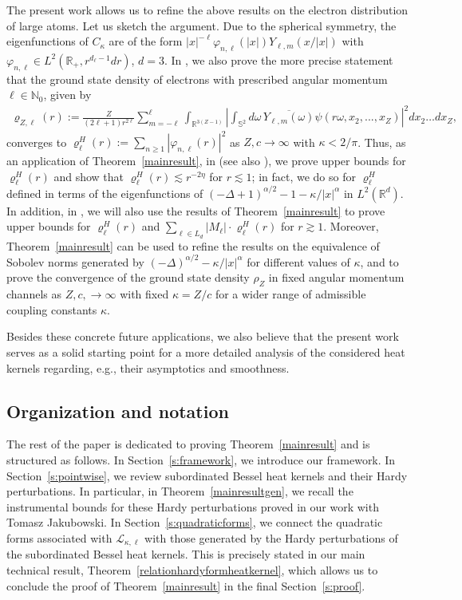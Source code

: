 \documentclass[12pt,reqno]{amsart}
\theoremstyle{definition}
\theoremstyle{remark}
\numberwithin{equation}{section}
\newcommand{\1}{\mathbbm{1}}
\newcommand{\N}{\mathbb{N}}
\renewcommand{\phi}{\varphi}
\newcommand{\R}{\mathbb{R}}
\def\bs{\mathbb{S}}
\def\cl{\mathcal{L}}
\begin{document}
The present work allows us to refine the above results on the electron distribution of large atoms. Let us sketch the argument. Due to the spherical symmetry, the eigenfunctions of $C_\kappa$ are of the form $|x|^{-\ell} \phi_{n,\ell}(|x|)Y_{\ell,m}(x/|x|)$ with $\phi_{n,\ell} \in L^2(\R_+,r^{d_\ell-1}dr)$, $d=3$. In \cite{Franketal2020P}, we also prove the more precise statement that the ground state density of electrons with prescribed angular momentum $\ell\in\N_0$, given by
\begin{align}
  \varrho_{Z,\ell}(r) := \frac{Z}{(2\ell+1) r^{2\ell}} \sum_{m=-\ell}^\ell \int_{\R^{3(Z-1)}}\left|\int_{\bs^2}d\omega\, \overline{Y_{\ell,m}(\omega)} \psi(r\omega,x_2,...,x_Z)\right|^2dx_2\ldots dx_Z,
\end{align}
converges to $\varrho_\ell^H(r):=\sum_{n\geq1}|\phi_{n,\ell}(r)|^2$ as $Z,c\to\infty$ with $\kappa<2/\pi$.
Thus, as an application of Theorem~\ref{mainresult}, in \cite{FrankMerz2025} (see also \cite{Merz2024H}), we prove upper bounds for $\varrho_\ell^H(r)$ and show that $\varrho_\ell^H(r)\lesssim r^{-2\eta}$ for $r\lesssim1$; in fact, we do so for $\varrho_\ell^H$ defined in terms of the eigenfunctions of $(-\Delta+1)^{\alpha/2}-1-\kappa/|x|^\alpha$ in $L^2(\R^d)$. In addition, in \cite{FrankMerz2025}, we will also use the results of Theorem~\ref{mainresult} to prove upper bounds for $\varrho_\ell^H(r)$ and $\sum_{\ell\in L_d}|M_\ell| \cdot \varrho_\ell^H(r)$ for $r\gtrsim1$.
Moreover, Theorem~\ref{mainresult} can be used to refine the results on the equivalence of Sobolev norms generated by $(-\Delta)^{\alpha/2}-\kappa/|x|^\alpha$ for different values of $\kappa$, and to prove the convergence of the ground state density $\rho_Z$ in fixed angular momentum channels as $Z,c,\to\infty$ with fixed $\kappa=Z/c$ for a wider range of admissible coupling constants $\kappa$.

Besides these concrete future applications, we also believe that the present work serves as a solid starting point for a more detailed analysis of the considered heat kernels regarding, e.g., their asymptotics and smoothness.


\subsection*{Organization and notation}

The rest of the paper is dedicated to proving Theorem~\ref{mainresult} and is structured as follows.
In Section~\ref{s:framework}, we introduce our framework.
In Section~\ref{s:pointwise}, we review subordinated Bessel heat kernels and their Hardy perturbations. In particular, in Theorem~\ref{mainresultgen}, we recall the instrumental bounds for these Hardy perturbations proved in our work \cite{Bogdanetal2024} with Tomasz Jakubowski.
In Section~\ref{s:quadraticforms}, we connect the quadratic forms associated with $\cl_{\kappa,\ell}$ with those generated by the Hardy perturbations of the subordinated Bessel heat kernels. This is precisely stated in our main technical result, Theorem~\ref{relationhardyformheatkernel}, which allows us to conclude the proof of Theorem~\ref{mainresult} in the final Section~\ref{s:proof}.
\end{document}
